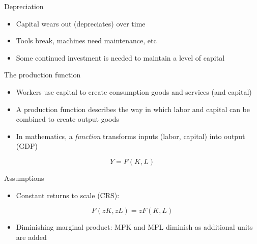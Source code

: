 \documentclass[10pt]{beamer}
\begin{document}
\begin{frame}[label={sec:org1d2561e}]{}
\alert{Depreciation}
\begin{itemize}
\item Capital wears out (depreciates) over time
\item Tools break, machines need maintenance, etc
\item Some continued investment is needed to maintain a level of capital
\end{itemize}
\end{frame}

\begin{frame}[label={sec:org720df37}]{}
\alert{The production function}
\begin{itemize}
\item Workers use capital to create consumption goods and services (and capital)
\item A production function describes the way in which labor and capital can be combined to create output goods
\item In mathematics, a \emph{function} transforms inputs (labor, capital) into output (GDP)
\end{itemize}

$$Y=F(K,L)$$
\end{frame}

\begin{frame}[label={sec:org57dbbaa}]{}
\alert{Assumptions}
\begin{itemize}
\item Constant returns to scale (CRS):
\end{itemize}
$$F(zK,zL) = zF(K,L)$$
\begin{itemize}
\item Diminishing marginal product: MPK and MPL diminish as additional units are added
\end{itemize}
\end{frame}
\end{document}
